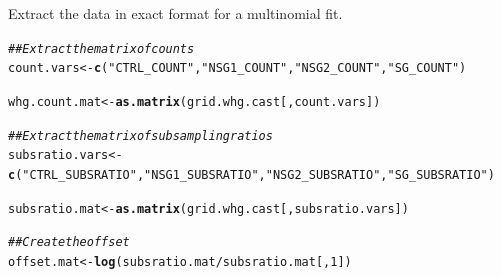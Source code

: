 \documentclass[12pt]{article}\usepackage[]{graphicx}\usepackage[]{color}
\makeatletter
\newcommand{\hlnum}[1]{\textcolor[rgb]{0.686,0.059,0.569}{#1}}%
\newcommand{\hlstr}[1]{\textcolor[rgb]{0.192,0.494,0.8}{#1}}%
\newcommand{\hlcom}[1]{\textcolor[rgb]{0.678,0.584,0.686}{\textit{#1}}}%
\newcommand{\hlopt}[1]{\textcolor[rgb]{0,0,0}{#1}}%
\newcommand{\hlstd}[1]{\textcolor[rgb]{0.345,0.345,0.345}{#1}}%
\newcommand{\hlkwb}[1]{\textcolor[rgb]{0.69,0.353,0.396}{#1}}%
\newcommand{\hlkwd}[1]{\textcolor[rgb]{0.737,0.353,0.396}{\textbf{#1}}}%
\newenvironment{kframe}{%
 \def\at@end@of@kframe{}%
 \ifinner\ifhmode%
  \def\at@end@of@kframe{\end{minipage}}%
  \begin{minipage}{\columnwidth}%
 \fi\fi%
 \def\FrameCommand##1{\hskip\@totalleftmargin \hskip-\fboxsep
 \colorbox{shadecolor}{##1}\hskip-\fboxsep
     \hskip-\linewidth \hskip-\@totalleftmargin \hskip\columnwidth}%
 \MakeFramed {\advance\hsize-\width
   \@totalleftmargin\z@ \linewidth\hsize
   \@setminipage}}%
 {\par\unskip\endMakeFramed%
 \at@end@of@kframe}
\newenvironment{knitrout}{}{} %
\makeatother
\begin{document}
Extract the data in exact format for a multinomial fit.  

\begin{knitrout}\footnotesize
{}\color{fgcolor}\begin{kframe}
\begin{alltt}
\hlcom{## Extract the matrix of counts}
\hlstd{count.vars} \hlkwb{<-} \hlkwd{c}\hlstd{(}\hlstr{"CTRL_COUNT"}\hlstd{,} \hlstr{"NSG1_COUNT"}\hlstd{,} \hlstr{"NSG2_COUNT"}\hlstd{,} \hlstr{"SG_COUNT"}\hlstd{)}

\hlstd{whg.count.mat} \hlkwb{<-} \hlkwd{as.matrix}\hlstd{(grid.whg.cast[, count.vars])}

\hlcom{## Extract the matrix of subsampling ratios}
\hlstd{subsratio.vars} \hlkwb{<-} \hlkwd{c}\hlstd{(}\hlstr{"CTRL_SUBSRATIO"}\hlstd{,} \hlstr{"NSG1_SUBSRATIO"}\hlstd{,} \hlstr{"NSG2_SUBSRATIO"}\hlstd{,} \hlstr{"SG_SUBSRATIO"}\hlstd{)}

\hlstd{subsratio.mat} \hlkwb{<-} \hlkwd{as.matrix}\hlstd{(grid.whg.cast[, subsratio.vars])}

\hlcom{## Create the offset}
\hlstd{offset.mat} \hlkwb{<-} \hlkwd{log}\hlstd{(subsratio.mat} \hlopt{/} \hlstd{subsratio.mat[,}\hlnum{1}\hlstd{])}
\end{alltt}
\end{kframe}
\end{knitrout}
\end{document}
